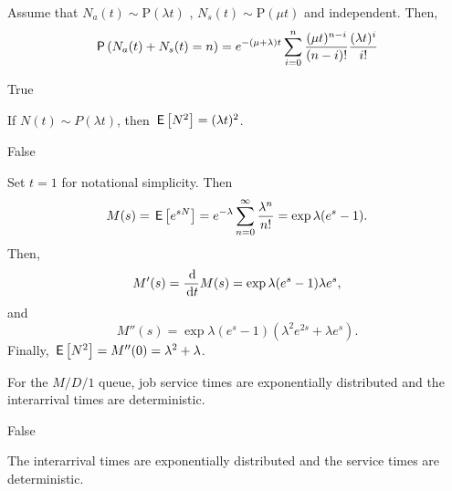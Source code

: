 \begin{exercise}[201703] Assume that
  $N_a(t)\sim \text{P}(\lambda t)$ , $N_s(t) \sim \text{P}(\mu t)$ and
  independent.   Then,
  \begin{equation*}
\P{N_a(t) + N_s(t) = n} 
= e^{-(\mu+\lambda)t} \sum_{i=0}^n \frac{(\mu t)^{n-i}}{(n-i)!} \frac{(\lambda t)^i}{i!}  \\
  \end{equation*}
\begin{solution}
    True
\end{solution}
\end{exercise}


\begin{exercise}[201703]
  If $N(t)\sim P(\lambda t)$,
 then $\,\mathsf{E}\left[N^2\right]=(\lambda t)^2$.

\begin{solution}
False

Set $t=1$ for notational simplicity. Then
\begin{equation*}
   M(s) = \,\mathsf{E}\left[e^{sN}\right] = e^{-\lambda}\sum_{n=0}^\infty \frac{\lambda^n}{n!} = \exp{\lambda(e^s-1)}.
\end{equation*}
Then, 
\begin{equation*}
  M'(s) = \frac{\d}{\d t} M(s) = \exp{\lambda(e^s-1)}\lambda e^s,
\end{equation*}
and 
\begin{equation*}
  M''(s) = \exp{\lambda(e^s-1)}(\lambda^2 e^{2s} + \lambda e^s).
\end{equation*}
Finally, 
$\,\mathsf{E}\left[N^2\right] = M''(0) = \lambda^2+\lambda$. 

\end{solution}
\end{exercise}


\begin{exercise}[201703]
  For the $M/D/1$ queue, job service times are exponentially
  distributed and the interarrival times are deterministic.

\begin{solution}
    False

    The interarrival times are exponentially distributed and the
    service times are deterministic.
\end{solution}
\end{exercise}

